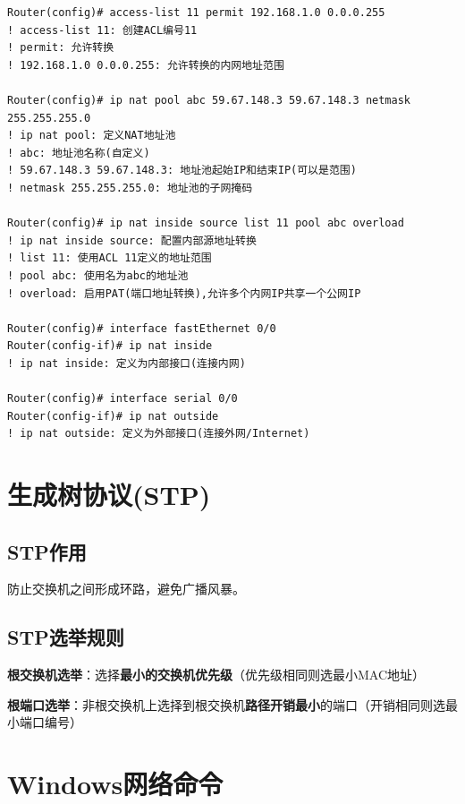 \documentclass[12pt,a4paper]{ctexart}
\begin{document}
\begin{cmdbox}
\begin{lstlisting}
Router(config)# access-list 11 permit 192.168.1.0 0.0.0.255
! access-list 11: 创建ACL编号11
! permit: 允许转换
! 192.168.1.0 0.0.0.255: 允许转换的内网地址范围

Router(config)# ip nat pool abc 59.67.148.3 59.67.148.3 netmask 255.255.255.0
! ip nat pool: 定义NAT地址池
! abc: 地址池名称(自定义)
! 59.67.148.3 59.67.148.3: 地址池起始IP和结束IP(可以是范围)
! netmask 255.255.255.0: 地址池的子网掩码

Router(config)# ip nat inside source list 11 pool abc overload
! ip nat inside source: 配置内部源地址转换
! list 11: 使用ACL 11定义的地址范围
! pool abc: 使用名为abc的地址池
! overload: 启用PAT(端口地址转换),允许多个内网IP共享一个公网IP

Router(config)# interface fastEthernet 0/0
Router(config-if)# ip nat inside
! ip nat inside: 定义为内部接口(连接内网)

Router(config)# interface serial 0/0
Router(config-if)# ip nat outside
! ip nat outside: 定义为外部接口(连接外网/Internet)
\end{lstlisting}
\end{cmdbox}

\section{生成树协议(STP)}

\subsection{STP作用}

防止交换机之间形成环路，避免广播风暴。

\subsection{STP选举规则}

\begin{keybox}
\textbf{根交换机选举}：选择\textbf{最小的交换机优先级}（优先级相同则选最小MAC地址）

\textbf{根端口选举}：非根交换机上选择到根交换机\textbf{路径开销最小}的端口（开销相同则选最小端口编号）
\end{keybox}

\section{Windows网络命令}
\end{document}
